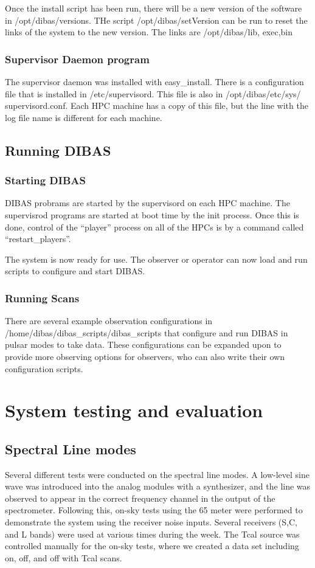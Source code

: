 \documentclass[11pt]{article}
\begin{document}
Once the install script has been run, there will be a new version of
the software in /opt/dibas/versions.  THe script /opt/dibas/setVersion
can be run to reset the links of the system to the new version.  The
links are /opt/dibas/{lib, exec,bin}

\subsubsection{Supervisor Daemon program}
The supervisor daemon was installed with easy\_install.  There is a
configuration file that is installed in /etc/supervisord.  This file
is also in /opt/dibas/etc/sys/ supervisord.conf.  Each HPC machine has
a copy of this file, but the line with the log file name is different
for each machine.

\subsection{Running DIBAS}

\subsubsection{Starting DIBAS}

DIBAS probrams are started by the supervisord on each HPC machine.
The supervisrod programs are started at boot time by the init process.
Once this is done, control of the ``player'' process on all of the
HPCs is by a command called ``restart\_players''.

The system is now ready for use.  The observer or operator can now
load and run scripts to configure and start DIBAS.
\subsubsection{Running Scans}
There are several example observation configurations in
/home/dibas/dibas\_scripts/dibas\_scripts that configure and run DIBAS
in pulsar modes to take data.  These configurations can be expanded
upon to provide more observing options for observers, who can also
write their own configuration scripts.

\section{System testing and evaluation}

\subsection{Spectral Line modes}
Several different tests were conducted on the spectral line modes.  A
low-level sine wave was introduced into the analog modules with a
synthesizer, and the line was observed to appear in the correct
frequency channel in the output of the spectrometer.  Following this,
on-sky tests using the 65 meter were performed to demonstrate the
system using the receiver noise inputs.  Several receivers (S,C, and L
bands) were used at various times during the week.  The Tcal source
was controlled manually for the on-sky tests, where we created a data
set including on, off, and off with Tcal scans.
\end{document}
